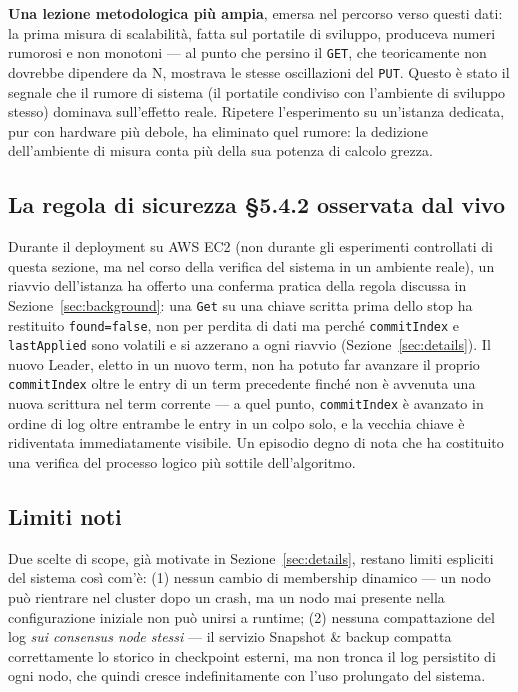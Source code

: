 \documentclass[conference]{IEEEtran}
\begin{document}
\textbf{Una lezione metodologica più ampia}, emersa nel percorso verso
questi dati: la prima misura di scalabilità, fatta sul portatile di
sviluppo, produceva numeri rumorosi e non monotoni — al punto che persino
il \texttt{GET}, che teoricamente non dovrebbe dipendere da N, mostrava le
stesse oscillazioni del \texttt{PUT}. Questo è stato il segnale che il
rumore di sistema (il portatile condiviso con l'ambiente di sviluppo
stesso) dominava sull'effetto reale. Ripetere l'esperimento su un'istanza
dedicata, pur con hardware più debole, ha eliminato quel rumore: la
dedizione dell'ambiente di misura conta più della sua potenza di calcolo
grezza.

\subsection{La regola di sicurezza \S5.4.2 osservata dal vivo}

Durante il deployment su AWS EC2 (non durante gli esperimenti controllati
di questa sezione, ma nel corso della verifica del sistema in un ambiente
reale), un riavvio dell'istanza ha offerto una conferma pratica della
regola discussa in Sezione~\ref{sec:background}: una \texttt{Get} su una
chiave scritta prima dello stop ha restituito \texttt{found=false}, non
per perdita di dati ma perché \texttt{commitIndex} e \texttt{lastApplied}
sono volatili e si azzerano a ogni riavvio (Sezione~\ref{sec:details}). Il
nuovo Leader, eletto in un nuovo term, non ha potuto far avanzare il
proprio \texttt{commitIndex} oltre le entry di un term precedente finché
non è avvenuta una nuova scrittura nel term corrente — a quel punto,
\texttt{commitIndex} è avanzato in ordine di log oltre entrambe le entry
in un colpo solo, e la vecchia chiave è ridiventata immediatamente
visibile. Un episodio degno di nota che ha costituito una verifica del processo logico più sottile dell'algoritmo.

\subsection{Limiti noti}

Due scelte di scope, già motivate in Sezione~\ref{sec:details}, restano
limiti espliciti del sistema così com'è: (1) nessun cambio di membership
dinamico — un nodo può rientrare nel cluster dopo un crash, ma un nodo mai
presente nella configurazione iniziale non può unirsi a runtime; (2)
nessuna compattazione del log \emph{sui consensus node stessi} — il
servizio Snapshot \& backup compatta correttamente lo storico in
checkpoint esterni, ma non tronca il log persistito di ogni nodo, che
quindi cresce indefinitamente con l'uso prolungato del sistema.
\end{document}
